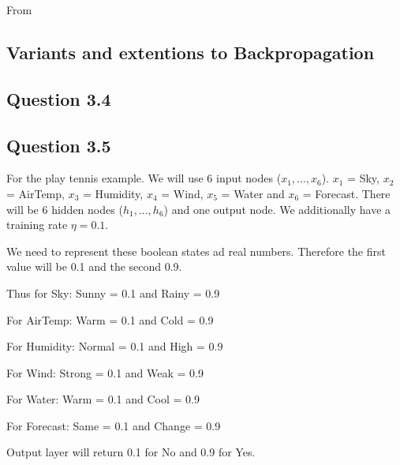 \documentclass[10pt,a4paper]{article}
\begin{document}
From \cite[p98]{Michell2009}

\subsection{Variants and extentions to Backpropagation}

\subsection{Question 3.4}

\subsection{Question 3.5}

For the play tennis example. We will use 6 input nodes ($x_1,...,x_6$). $x_1$ = Sky, $x_2$ = AirTemp, $x_3$ = Humidity, $x_4$ = Wind, $x_5$ = Water and $x_6$ = Forecast. There will be 6 hidden nodes ($h_1,...,h_6$) and one output node. We additionally have a training rate $\eta = 0.1$.

We need to represent these boolean states ad real numbers. Therefore the first value will be 0.1 and the second 0.9. 

Thus for Sky: Sunny = 0.1 and Rainy = 0.9 

For AirTemp: Warm = 0.1 and Cold = 0.9

For Humidity: Normal = 0.1 and High = 0.9

For Wind: Strong = 0.1 and Weak = 0.9

For Water: Warm = 0.1 and Cool = 0.9

For Forecast: Same = 0.1 and Change = 0.9 

Output layer will return 0.1 for No and 0.9 for Yes.
\end{document}
